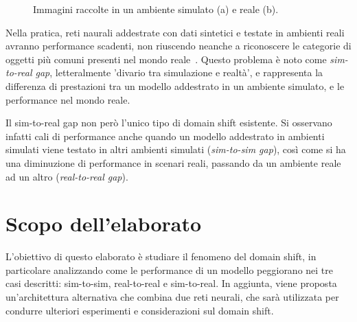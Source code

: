 \documentclass[12pt]{report}
\begin{document}
\begin{figure}[t]
	\centering
	\hspace{0.01\textwidth}
	\caption{Immagini raccolte in un ambiente simulato (a) e reale (b).}
	\label{fig:immagine-simulata-reale}
\end{figure}

Nella pratica, reti naurali addestrate con dati sintetici e testate in ambienti reali avranno performance scadenti, non riuscendo neanche a riconoscere le categorie di oggetti più comuni presenti nel mondo reale~\cite{8793591}. Questo problema è noto come \textit{sim-to-real gap}, letteralmente 'divario tra simulazione e realtà', e rappresenta la differenza di prestazioni tra un modello addestrato in un ambiente simulato, e le performance nel mondo reale.

Il sim-to-real gap non però l'unico tipo di domain shift esistente. Si osservano infatti cali di performance anche quando un modello addestrato in ambienti simulati viene testato in altri ambienti simulati (\textit{sim-to-sim gap}), così come si ha una diminuzione di performance in scenari reali, passando da un ambiente reale ad un altro (\textit{real-to-real gap}).

\section{Scopo dell'elaborato}
\label{chap:scopo_elaborato}

L'obiettivo di questo elaborato è studiare il fenomeno del domain shift, in particolare analizzando come le performance di un modello peggiorano nei tre casi descritti: sim-to-sim, real-to-real e sim-to-real. In aggiunta, viene proposta un'architettura alternativa che combina due reti neurali, che sarà utilizzata per condurre ulteriori esperimenti e considerazioni sul domain shift.
\end{document}
